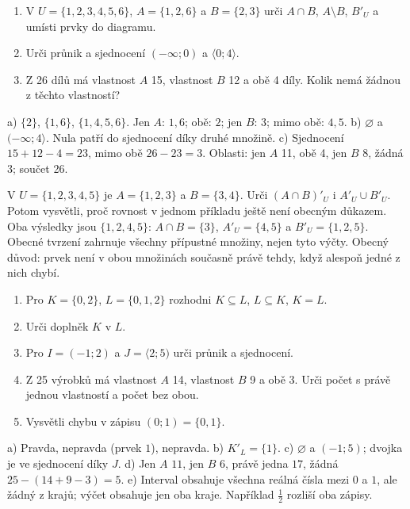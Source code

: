 \documentclass[11pt,a4paper]{article}
\begin{document}
\begin{zadaniReseniBox}[title={S1: zvol nejvýše potřebné položky},breakable=false]
\begin{enumerate}[label=\alph*)]
\item V $U=\{1,2,3,4,5,6\}$, $A=\{1,2,6\}$ a $B=\{2,3\}$
urči $A\cap B$, $A\setminus B$, $B'_U$ a umísti prvky do diagramu.
\item Urči průnik a sjednocení $(-\infty;0)$ a $\langle0;4\rangle$.
\item Z 26 dílů má vlastnost $A$ 15, vlastnost $B$ 12 a obě 4 díly.
Kolik nemá žádnou z těchto vlastností?
\end{enumerate}
\tcblower
a) $\{2\}$, $\{1,6\}$, $\{1,4,5,6\}$.
Jen $A$: $1,6$; obě: $2$; jen $B$: $3$; mimo obě: $4,5$.
b) $\varnothing$ a $(-\infty;4\rangle$. Nula patří do sjednocení díky druhé množině.
c) Sjednocení $15+12-4=23$, mimo obě $26-23=3$.
Oblasti: jen $A$ 11, obě 4, jen $B$ 8, žádná 3; součet 26.
\end{zadaniReseniBox}

\begin{zadaniReseniBox}[title={R1: pro rychlé nebo místo části S1},breakable=false]
V $U=\{1,2,3,4,5\}$ je $A=\{1,2,3\}$ a $B=\{3,4\}$.
Urči $(A\cap B)'_U$ i $A'_U\cup B'_U$.
Potom vysvětli, proč rovnost v jednom příkladu ještě není obecným důkazem.
\tcblower
Oba výsledky jsou $\{1,2,4,5\}$:
$A\cap B=\{3\}$, $A'_U=\{4,5\}$ a $B'_U=\{1,2,5\}$.
Obecné tvrzení zahrnuje všechny přípustné množiny, nejen tyto výčty.
Obecný důvod: prvek není v obou množinách současně právě tehdy,
když alespoň jedné z nich chybí.
\end{zadaniReseniBox}

\begin{zadaniReseniBox}[title={D1: 10–15 minut}]
\begin{enumerate}[label=\alph*)]
\item Pro $K=\{0,2\}$, $L=\{0,1,2\}$ rozhodni $K\subseteq L$, $L\subseteq K$, $K=L$.
\item Urči doplněk $K$ v $L$.
\item Pro $I=(-1;2)$ a $J=\langle2;5)$ urči průnik a sjednocení.
\item Z 25 výrobků má vlastnost $A$ 14, vlastnost $B$ 9 a obě 3.
Urči počet s právě jednou vlastností a počet bez obou.
\item Vysvětli chybu v zápisu $(0;1)=\{0,1\}$.
\end{enumerate}
\tcblower
a) Pravda, nepravda (prvek $1$), nepravda.
b) $K'_L=\{1\}$.
c) $\varnothing$ a $(-1;5)$; dvojka je ve sjednocení díky $J$.
d) Jen $A$ $11$, jen $B$ $6$, právě jedna $17$, žádná $25-(14+9-3)=5$.
e) Interval obsahuje všechna reálná čísla mezi $0$ a $1$, ale žádný z krajů;
výčet obsahuje jen oba kraje. Například $\frac12$ rozliší oba zápisy.
\end{zadaniReseniBox}
\end{document}
